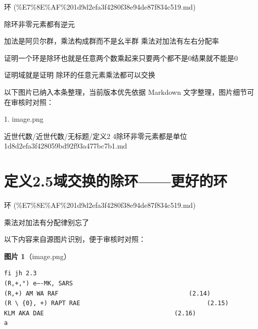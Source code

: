 \begin{note}[来源上级主题]

环 (\%E7\%8E\%AF\%201d9d2efa3f4280f38e94de87f834c519.md)

\end{note}

\begin{definition}[定义2.4除环非零元素都是单位]

除环非零元素都有逆元

加法是阿贝尔群，乘法构成群而不是幺半群 乘法对加法有左右分配率

证明一个环是除环也就是任意两个数乘起来只要两个都不是0结果就不能是0

证明域就是证明 除环的任意元素乘法都可以交换

\end{definition}

\begin{note}[关联图片]
以下图片已纳入本条整理，当前版本优先依据 Markdown 文字整理，图片细节可在审核时对照：

1. image.png\\

\end{note}

\begin{note}[来源路径]

近世代数/近世代数/无标题/定义2 4除环非零元素都是单位 1d8d2efa3f428059bd92f93a477bc7b1.md

\end{note}

\section*{定义2.5域交换的除环——更好的环}

\begin{note}[来源上级主题]

环 (\%E7\%8E\%AF\%201d9d2efa3f4280f38e94de87f834c519.md)

\end{note}

\begin{definition}

乘法对加法有分配律别忘了

\end{definition}

\begin{note}
以下内容来自源图片识别，便于审核时对照：

\textbf{图片 1}（image.png）
\begin{Verbatim}[fontsize=\small]
fi jh 2.3
(R,+,°) e—-MK, SARS
(R,+) AM WA RAF                                    (2.14)
(R \ {0}, +) RAPT RAE                                   (2.15)
KLM AKA DAE                                    (2.16)
a
\end{Verbatim}

\end{note}

